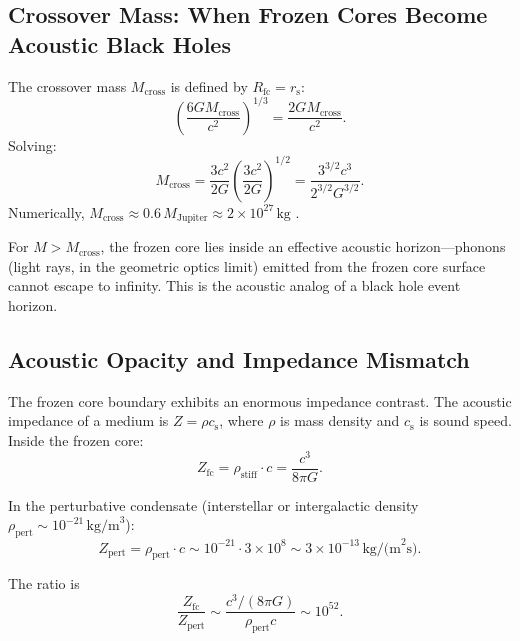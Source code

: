 \documentclass[12pt,a4paper]{article}
\newcommand{\rhostiff}{\rho_\text{stiff}}
\newcommand{\Rfc}{R_\text{fc}}
\newcommand{\Mcross}{M_\text{cross}}
\newcommand{\Zfc}{Z_\text{fc}}
\newcommand{\Zpert}{Z_\text{pert}}
\theoremstyle{definition}
\begin{document}
\subsection{Crossover Mass: When Frozen Cores Become Acoustic Black Holes}
\label{subsec:crossover_mass}

The crossover mass $\Mcross$ is defined by $\Rfc = r_\text{s}$:
\begin{equation}
\left( \frac{6G\Mcross}{c^2} \right)^{1/3} = \frac{2G\Mcross}{c^2}.
\end{equation}
Solving:
\begin{equation}
\Mcross = \frac{3c^2}{2G} \left( \frac{3c^2}{2G} \right)^{1/2} = \frac{3^{3/2} c^3}{2^{3/2} G^{3/2}}.
\label{eq:Mcross}
\end{equation}
Numerically, $\Mcross \approx 0.6\,M_\text{Jupiter} \approx 2 \times 10^{27}\,\text{kg}$ \cite{PlanckFieldI}.

For $M > \Mcross$, the frozen core lies inside an effective acoustic horizon—phonons (light rays, in the geometric optics limit) emitted from the frozen core surface cannot escape to infinity. This is the acoustic analog of a black hole event horizon.

\subsection{Acoustic Opacity and Impedance Mismatch}
\label{subsec:acoustic_opacity}

The frozen core boundary exhibits an enormous impedance contrast. The acoustic impedance of a medium is $Z = \rho c_\text{s}$, where $\rho$ is mass density and $c_\text{s}$ is sound speed. Inside the frozen core:
\begin{equation}
\Zfc = \rhostiff \cdot c = \frac{c^3}{8\pi G}.
\label{eq:Zfc}
\end{equation}

In the perturbative condensate (interstellar or intergalactic density $\rho_\text{pert} \sim 10^{-21}\,\text{kg/m}^3$):
\begin{equation}
\Zpert = \rho_\text{pert} \cdot c \sim 10^{-21} \cdot 3 \times 10^8 \sim 3 \times 10^{-13}\,\text{kg/(m}^2\text{s)}.
\label{eq:Zpert}
\end{equation}

The ratio is
\begin{equation}
\frac{\Zfc}{\Zpert} \sim \frac{c^3/(8\pi G)}{\rho_\text{pert} c} \sim 10^{52}.
\label{eq:impedance_ratio}
\end{equation}
\end{document}
